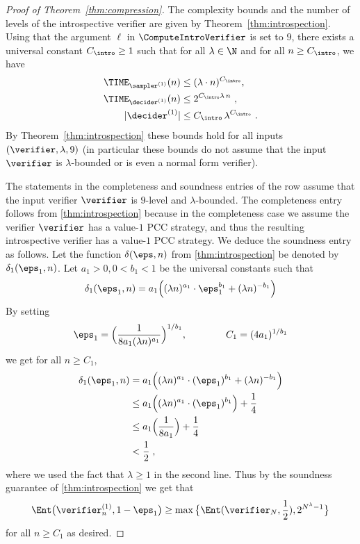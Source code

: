 \begin{proof}[Proof of Theorem~\ref{thm:compression}]
  The complexity bounds and the number of levels of the introspective verifier are given by
  Theorem~\ref{thm:introspection}. Using that the argument $\ell$ in $\ComputeIntroVerifier$ is set to $9$, 
  there exists a universal constant $C_\intro \geq 1$ such that for all $\lambda\in \N$ and for all $n \geq C_\intro$, we have
  \begin{equation}
    \label{eq:c_intro}
    \begin{split}
    \TIME_{\sampler^{(1)}}(n) & \le (\lambda \cdot n)^{C_\intro},\\
    \TIME_{\decider^{(1)}}(n) & \le 2^{C_\intro \lambda\,n}~, \\
    |\decider^{(1)}| &\le C_\intro \, \lambda^{C_\intro}~.
    \end{split}
  \end{equation}
  By Theorem~\ref{thm:introspection} these bounds hold for all inputs $(\verifier,
  \lambda, 9)$ (in particular these bounds do not assume that the input $\verifier$ is $\lambda$-bounded or is even a normal form verifier).

  The statements in the completeness and soundness entries of the row assume that the input
  verifier $\verifier$ is $9$-level and $\lambda$-bounded. 
  The completeness entry follows from \cref{thm:introspection} because in the completeness case we assume the verifier $\verifier$ has a value-$1$ PCC strategy, and thus the resulting introspective verifier has a value-$1$ PCC strategy. We deduce the soundness entry as follows. 
Let the function $\delta(\eps,n)$ from \cref{thm:introspection} be denoted by $\delta_1(\eps_1,n)$. Let $a_1 > 0, 0 < b_1 < 1$ be the universal constants such that
   \begin{equation}
    \label{eq:re-delta-1}
    \delta_1(\eps_1, n) = a_1 \Bigl((\lambda n)^{a_1} \cdot \eps_1^{b_1} +
    ( \lambda n )^{-b_1} \Bigr)
  \end{equation}
  By setting
  \begin{equation}
  \label{eq:re-eps-1}
  	\eps_1 = \Bigl( \frac{1}{8 a_1 (\lambda n)^{a_1}} \Bigr)^{1/b_1}, \qquad \qquad C_1 = ( 4 a_1 )^{1/b_1}
  \end{equation}
  we get for all $n \geq C_1$, 
  \begin{equation*}
    \begin{split}
      \delta_1(\eps_1,n) &= a_1 \Bigl( (\lambda n)^{a_1} \cdot (\eps_1)^{b_1}+
      ( \lambda n)^{-b_1} \Bigr) \\
      & \le a_1 \Bigl( (\lambda n)^{a_1} \cdot (\eps_1)^{b_1}
      \Bigr) + \frac{1}{4} \\
      & \le a_1 \Bigl( \frac{1}{8 a_1} \Bigr) + \frac{1}{4}\\
      & < \frac{1}{2} \;,
    \end{split}
  \end{equation*}
  where we used the fact that $\lambda \ge 1$ in the second line. Thus by the soundness guarantee of \cref{thm:introspection} we get that
  \[
  	\Ent \big(
    \verifier_n^{(1)}, 1 - \eps_1 \big) \geq \max \big
    \{\Ent(\verifier_N, \frac{1}{2}), 2^{N^\lambda - 1} \big \}
  \]
  for all $n \geq C_1$ as desired.
	

\end{proof}

